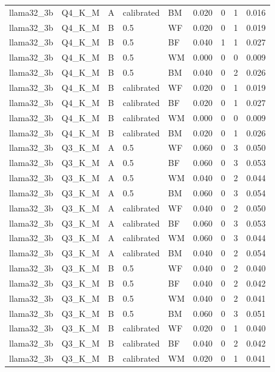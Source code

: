 \begin{tabular}{lllllrrrr}
llama32\_3b & Q4\_K\_M & A & calibrated & BM & 0.020 & 0 & 1 & 0.016 \\
llama32\_3b & Q4\_K\_M & B & 0.5 & WF & 0.020 & 0 & 1 & 0.019 \\
llama32\_3b & Q4\_K\_M & B & 0.5 & BF & 0.040 & 1 & 1 & 0.027 \\
llama32\_3b & Q4\_K\_M & B & 0.5 & WM & 0.000 & 0 & 0 & 0.009 \\
llama32\_3b & Q4\_K\_M & B & 0.5 & BM & 0.040 & 0 & 2 & 0.026 \\
llama32\_3b & Q4\_K\_M & B & calibrated & WF & 0.020 & 0 & 1 & 0.019 \\
llama32\_3b & Q4\_K\_M & B & calibrated & BF & 0.020 & 0 & 1 & 0.027 \\
llama32\_3b & Q4\_K\_M & B & calibrated & WM & 0.000 & 0 & 0 & 0.009 \\
llama32\_3b & Q4\_K\_M & B & calibrated & BM & 0.020 & 0 & 1 & 0.026 \\
llama32\_3b & Q3\_K\_M & A & 0.5 & WF & 0.060 & 0 & 3 & 0.050 \\
llama32\_3b & Q3\_K\_M & A & 0.5 & BF & 0.060 & 0 & 3 & 0.053 \\
llama32\_3b & Q3\_K\_M & A & 0.5 & WM & 0.040 & 0 & 2 & 0.044 \\
llama32\_3b & Q3\_K\_M & A & 0.5 & BM & 0.060 & 0 & 3 & 0.054 \\
llama32\_3b & Q3\_K\_M & A & calibrated & WF & 0.040 & 0 & 2 & 0.050 \\
llama32\_3b & Q3\_K\_M & A & calibrated & BF & 0.060 & 0 & 3 & 0.053 \\
llama32\_3b & Q3\_K\_M & A & calibrated & WM & 0.060 & 0 & 3 & 0.044 \\
llama32\_3b & Q3\_K\_M & A & calibrated & BM & 0.040 & 0 & 2 & 0.054 \\
llama32\_3b & Q3\_K\_M & B & 0.5 & WF & 0.040 & 0 & 2 & 0.040 \\
llama32\_3b & Q3\_K\_M & B & 0.5 & BF & 0.040 & 0 & 2 & 0.042 \\
llama32\_3b & Q3\_K\_M & B & 0.5 & WM & 0.040 & 0 & 2 & 0.041 \\
llama32\_3b & Q3\_K\_M & B & 0.5 & BM & 0.060 & 0 & 3 & 0.051 \\
llama32\_3b & Q3\_K\_M & B & calibrated & WF & 0.020 & 0 & 1 & 0.040 \\
llama32\_3b & Q3\_K\_M & B & calibrated & BF & 0.040 & 0 & 2 & 0.042 \\
llama32\_3b & Q3\_K\_M & B & calibrated & WM & 0.020 & 0 & 1 & 0.041 \\

\end{tabular}
